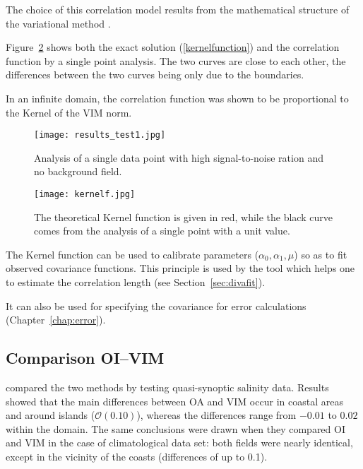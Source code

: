 The choice of this correlation model results from the mathematical structure of the variational method \citep{BRASSEUR96}.

Figure~\ref{kernel1} shows both the exact solution (\ref{kernelfunction}) and the correlation function by a single point analysis. The two curves are close to each other, the differences between the two curves being only due to the boundaries.

In an infinite domain, the correlation function was shown to be proportional to the Kernel of the VIM norm.

\begin{figure}[htpb]
	\centering
	\parbox{.6\textwidth}{
		\texttt{[image: results\_test1.jpg]}
		}\parbox{.4\textwidth}{
		\caption{Analysis of a single data point with high signal-to-noise ration and no background field.\label{singleanalysis}}}
\end{figure}

\begin{figure}[htpb]
	\centering
	\parbox{.6\textwidth}{
		\texttt{[image: kernelf.jpg]}
		}\parbox{.4\textwidth}{
		\caption[Theoretical Kernel function and analysis of a single point with a unit value.]{The theoretical Kernel function is given in red, while the black curve comes from the analysis of a single point with a unit value.\label{kernel1}}}
\end{figure}

The Kernel function can be used to calibrate \diva parameters ($\alpha_0, \alpha_1, \mu$) so as to fit observed covariance functions. This principle is used by the tool  which helps one to estimate the correlation length (see Section~\ref{sec:divafit}).

It can also be used for specifying the covariance for error calculations (Chapter~\ref{chap:error}).


\subsection{Comparison OI--VIM}

\citet{RIXEN00} compared the two methods by testing quasi-synoptic salinity data. Results showed that the main differences between OA and VIM occur in coastal areas and around islands ($\mathcal{O}(0.10)$), whereas the differences range from $-0.01$ to $0.02$ within the domain. The same conclusions were drawn when they compared OI and VIM in the case of climatological data set: both fields were nearly identical, except in the vicinity of the coasts (differences of up to 0.1).


